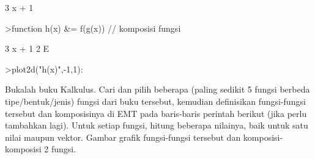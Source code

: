 \documentclass[a4paper,10pt]{article}
\begin{document}
\begin{eulernotebook}
\begin{euleroutput}
                                 3 x + 1
  
\end{euleroutput}
\begin{eulerprompt}
>function h(x) &= f(g(x)) // komposisi fungsi
\end{eulerprompt}
\begin{euleroutput}
  
                                   3 x + 1
                                2 E
  
\end{euleroutput}
\begin{eulerprompt}
>plot2d("h(x)",-1,1):
\end{eulerprompt}
\begin{eulercomment}
Bukalah buku Kalkulus. Cari dan pilih beberapa (paling sedikit 5 fungsi berbeda
tipe/bentuk/jenis) fungsi dari buku tersebut, kemudian definisikan fungsi-fungsi tersebut dan
komposisinya di EMT pada baris-baris perintah berikut (jika perlu tambahkan lagi). Untuk setiap
fungsi, hitung beberapa nilainya, baik untuk satu nilai maupun vektor. Gambar grafik
fungsi-fungsi tersebut dan komposisi-komposisi 2 fungsi.


\end{eulercomment}
\end{eulernotebook}
\end{document}
